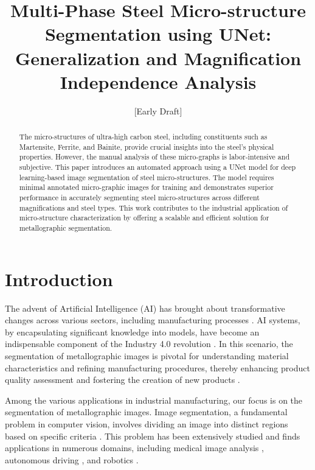 \documentclass[]{article}
\title{Multi-Phase Steel Micro-structure Segmentation using UNet: Generalization and Magnification Independence Analysis}
\author{[Early Draft]}
\begin{document}
\maketitle

\begin{abstract}
	
The micro-structures of ultra-high carbon steel, including constituents such as Martensite, Ferrite, and Bainite, provide crucial insights into the steel's physical properties. However, the manual analysis of these micro-graphs is labor-intensive and subjective. This paper introduces an automated approach using a UNet model for deep learning-based image segmentation of steel micro-structures. The model requires minimal annotated micro-graphic images for training and demonstrates superior performance in accurately segmenting steel micro-structures across different magnifications and steel types. This work contributes to the industrial application of micro-structure characterization by offering a scalable and efficient solution for metallographic segmentation.

\end{abstract}

\section{Introduction}

The advent of Artificial Intelligence (AI) has brought about transformative changes across various sectors, including manufacturing processes \cite{russel2010}. AI systems, by encapsulating significant knowledge into models, have become an indispensable component of the Industry 4.0 revolution \cite{lasi2014industry}. In this scenario, the segmentation of metallographic images is pivotal for understanding material characteristics and refining manufacturing procedures, thereby enhancing product quality assessment and fostering the creation of new products \cite{gonzalez2008digital, cv_algandapp}.

Among the various applications in industrial manufacturing, our focus is on the segmentation of metallographic images. Image segmentation, a fundamental problem in computer vision, involves dividing an image into distinct regions based on specific criteria \cite{HARALICK1985100}. This problem has been extensively studied and finds applications in numerous domains, including medical image analysis \cite{Litjens_2017, shen2017}, autonomous driving \cite{chen2017deeplab}, and robotics \cite{garciagarcia2017review}.
\end{document}
